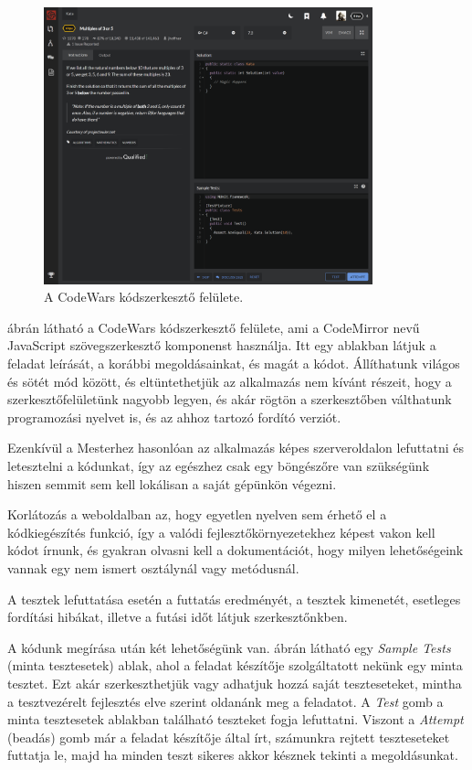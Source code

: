 \begin{figure}[h]
    \centering
    \includegraphics[width=0.85\textwidth]{images/codewars_editor.png}
    \caption{A CodeWars kódszerkesztő felülete.}
    \label{fig:codewars_editor}
\end{figure}

 ábrán látható a CodeWars kódszerkesztő felülete, ami a CodeMirror nevű JavaScript szövegszerkesztő komponenst használja. Itt egy ablakban látjuk a feladat leírását, a korábbi megoldásainkat, és magát a kódot. Állíthatunk világos és sötét mód között, és eltüntethetjük az alkalmazás nem kívánt részeit, hogy a szerkesztőfelületünk nagyobb legyen, és akár rögtön a szerkesztőben válthatunk programozási nyelvet is, és az ahhoz tartozó fordító verziót.

Ezenkívül a Mesterhez hasonlóan az alkalmazás képes szerveroldalon lefuttatni és letesztelni a kódunkat, így az egészhez csak egy böngészőre van szükségünk hiszen semmit sem kell lokálisan a saját gépünkön végezni.

Korlátozás a weboldalban az, hogy egyetlen nyelven sem érhető el a kódkiegészítés funkció, így a valódi fejlesztőkörnyezetekhez képest vakon kell kódot írnunk, és gyakran olvasni kell a dokumentációt, hogy milyen lehetőségeink vannak egy nem ismert osztálynál vagy metódusnál.

A tesztek lefuttatása esetén a futtatás eredményét, a tesztek kimenetét, esetleges fordítási hibákat, illetve a futási időt látjuk szerkesztőnkben.

A kódunk megírása után két lehetőségünk van.  ábrán látható egy \emph{Sample Tests} (minta tesztesetek) ablak, ahol a feladat készítője szolgáltatott nekünk egy minta tesztet. Ezt akár szerkeszthetjük vagy adhatjuk hozzá saját teszteseteket, mintha a tesztvezérelt fejlesztés elve szerint oldanánk meg a feladatot. A \emph{Test} gomb a minta tesztesetek ablakban található teszteket fogja lefuttatni. Viszont a \emph{Attempt} (beadás) gomb már a feladat készítője által írt, számunkra rejtett teszteseteket futtatja le, majd ha minden teszt sikeres akkor késznek tekinti a megoldásunkat.

